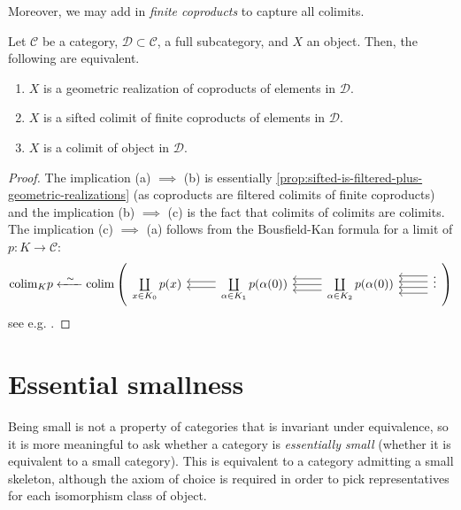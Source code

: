 Moreover, we may add in \emph{finite coproducts} to capture all colimits.
\def\cC{\mathcal{C}}
\def\cD{\mathcal{D}}
\begin{proposition}\label{prop:colimit-is-sifted-plus-finite-coproducts}
  Let $\cC$ be a category, $\cD \subset \cC$, a full subcategory, and $X$ an object.
  Then, the following are equivalent.
  \begin{enumerate}[label={(\alph*)}]
    \item $X$ is a geometric realization of coproducts of elements in $\cD$.
    \item $X$ is a sifted colimit of finite coproducts of elements in $\cD$.
    \item $X$ is a colimit of object in $\cD$.
  \end{enumerate}
\end{proposition}
\begin{proof}
  The implication (a) $\implies$ (b) is essentially \autoref{prop:sifted-is-filtered-plus-geometric-realizations} (as coproducts are filtered colimits of finite coproducts) and the implication (b) $\implies$ (c) is the fact that colimits of colimits are colimits.
  The implication (c) $\implies$ (a) follows from the Bousfield-Kan formula for a limit of $p\colon K \rightarrow \cC$:
  \[
    \colim_K p \xleftarrow{\;\;\sim\;\;} \colim \left(
\begin{tikzcd}
	{\coprod\limits_{x \in K_0} p(x)} & {\coprod\limits_{\alpha \in K_1} p(\alpha(0))} & {\coprod\limits_{\alpha \in K_2} p(\alpha(0))} & \vdots
	\arrow[shift left, from=1-2, to=1-1]
	\arrow[shift right, from=1-2, to=1-1]
	\arrow[from=1-3, to=1-2]
	\arrow[shift right=2, from=1-3, to=1-2]
	\arrow[shift left=2, from=1-3, to=1-2]
	\arrow[shift left, from=1-4, to=1-3]
	\arrow[shift right, from=1-4, to=1-3]
	\arrow[shift left=3, from=1-4, to=1-3]
	\arrow[shift right=3, from=1-4, to=1-3]
\end{tikzcd}
    \right)
  \] 
  see e.g. \cite[Cor~12.5]{Shah}.
\end{proof}
\section{Essential smallness}

Being small is not a property of categories that is invariant under equivalence, so it is more meaningful to ask whether a category is \textit{essentially small} (whether it is equivalent to a small category). This is equivalent to a category admitting a small skeleton, although the axiom of choice is required in order to pick representatives for each isomorphism class of object.

